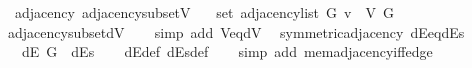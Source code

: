 \begin{isabellebody}
\isamarkupfalse%
%
\endisatagproof
{\isafoldproof}%
%
\isadelimproof
\isanewline
%
\endisadelimproof
\isanewline
{}\isamarkupfalse%
\ {\isacharparenleft}{\kern0pt}\ adjacency{\isacharparenright}{\kern0pt}\ adjacency{\isacharunderscore}{\kern0pt}subset{\isacharunderscore}{\kern0pt}V{\isacharcolon}{\kern0pt}\isanewline
\ \ \ {\isachardoublequoteopen}set\ {\isacharparenleft}{\kern0pt}adjacency{\isacharunderscore}{\kern0pt}list\ G\ v{\isacharparenright}{\kern0pt}\ {\isasymsubseteq}\ V\ G{\isachardoublequoteclose}\isanewline
%
\isadelimproof
\ \ %
\endisadelimproof
%
\isatagproof
{}\isamarkupfalse%
\ adjacency{\isacharunderscore}{\kern0pt}subset{\isacharunderscore}{\kern0pt}dV\isanewline
\ \ \isamarkupfalse%
\ {\isacharparenleft}{\kern0pt}simp\ add{\isacharcolon}{\kern0pt}\ V{\isacharunderscore}{\kern0pt}eq{\isacharunderscore}{\kern0pt}dV{\isacharparenright}{\kern0pt}%
\endisatagproof
{\isafoldproof}%
%
\isadelimproof
%
\endisadelimproof
%
\isadelimdocument
%
\endisadelimdocument
%
\isatagdocument
%
\isamarkupsubsection{%
}
\isamarkuptrue%
%
\endisatagdocument
{\isafolddocument}%
%
\isadelimdocument
%
\endisadelimdocument
{}\isamarkupfalse%
\ {\isacharparenleft}{\kern0pt}\ symmetric{\isacharunderscore}{\kern0pt}adjacency{\isacharparenright}{\kern0pt}\ dE{\isacharunderscore}{\kern0pt}eq{\isacharunderscore}{\kern0pt}dEs{\isacharcolon}{\kern0pt}\isanewline
\ \ \ {\isachardoublequoteopen}dE\ G\ {\isacharequal}{\kern0pt}\ dEs{\isachardoublequoteclose}\isanewline
%
\isadelimproof
\ \ %
\endisadelimproof
%
\isatagproof
{}\isamarkupfalse%
\ dE{\isacharunderscore}{\kern0pt}def\ dEs{\isacharunderscore}{\kern0pt}def\isanewline
\ \ \isamarkupfalse%
\ {\isacharparenleft}{\kern0pt}simp\ add{\isacharcolon}{\kern0pt}\ mem{\isacharunderscore}{\kern0pt}adjacency{\isacharunderscore}{\kern0pt}iff{\isacharunderscore}{\kern0pt}edge{\isacharparenright}{\kern0pt}%
\endisatagproof
{\isafoldproof}%
%
\isadelimproof
\isanewline
%
\endisadelimproof
%
\isadelimtheory
\isanewline
%
\endisadelimtheory
%
\isatagtheory
{}\isamarkupfalse%
%
\endisatagtheory
{\isafoldtheory}%
%
\isadelimtheory
%
\endisadelimtheory
%
\end{isabellebody}%
\endinput
